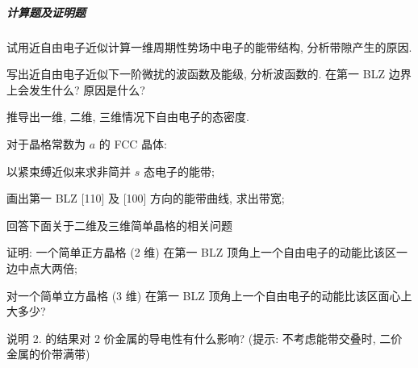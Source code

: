 \documentclass[UTF8]{ctexart}
\begin{document}
    \subparagraph{计算题及证明题}
        \begin{Question}
            \item 试用近自由电子近似计算一维周期性势场中电子的能带结构, 分析带隙产生的原因.
            \item 写出近自由电子近似下一阶微扰的波函数及能级, 分析波函数的. 在第一 BLZ 边界上会发生什么? 原因是什么?
            \item 推导出一维, 二维, 三维情况下自由电子的态密度.
            \item 对于晶格常数为 $a$ 的 FCC 晶体:
                \begin{Question}
                    \item 以紧束缚近似来求非简并 $s$ 态电子的能带;
                    \item 画出第一 BLZ [110] 及 [100] 方向的能带曲线, 求出带宽;
                \end{Question}
            \item 回答下面关于二维及三维简单晶格的相关问题
                \begin{Question}
                    \item 证明: 一个简单正方晶格 (2 维) 在第一 BLZ 顶角上一个自由电子的动能比该区一边中点大两倍;
                    \item 对一个简单立方晶格 (3 维) 在第一 BLZ 顶角上一个自由电子的动能比该区面心上大多少?
                    \item 说明 2\BraPR. 的结果对 2 价金属的导电性有什么影响? (提示: 不考虑能带交叠时, 二价金属的价带满带)
                \end{Question}
        \end{Question}
\end{document}
